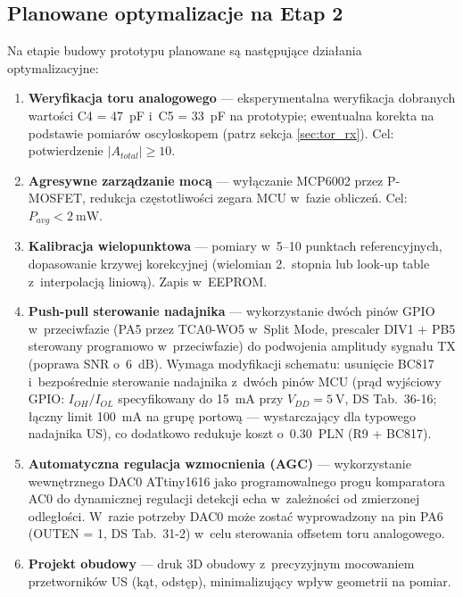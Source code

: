 \documentclass[a4paper,11pt]{article}
\begin{document}
\subsection{Planowane optymalizacje na Etap 2}

Na etapie budowy prototypu planowane są następujące działania optymalizacyjne:

\begin{enumerate}[nosep]
    \item \textbf{Weryfikacja toru analogowego} --- eksperymentalna weryfikacja
          dobranych wartości C4 = \SI{47}{\pico\farad} i~C5 = \SI{33}{\pico\farad}
          na prototypie; ewentualna korekta na podstawie pomiarów oscyloskopem
          (patrz sekcja \ref{sec:tor_rx}). Cel: potwierdzenie $|A_{total}| \geq 10$.
    \item \textbf{Agresywne zarządzanie mocą} --- wyłączanie MCP6002 przez
          P-MOSFET, redukcja częstotliwości zegara MCU w~fazie obliczeń.
          Cel: $P_{avg} < \SI{2}{\milli\watt}$.
    \item \textbf{Kalibracja wielopunktowa} --- pomiary w~5--10 punktach
          referencyjnych, dopasowanie krzywej korekcyjnej (wielomian 2.~stopnia
          lub look-up table z~interpolacją liniową). Zapis w~EEPROM.
    \item \textbf{Push-pull sterowanie nadajnika} --- wykorzystanie dwóch pinów
          GPIO w~przeciwfazie (PA5 przez TCA0-WO5 w~Split Mode, prescaler DIV1
          + PB5 sterowany
          programowo w~przeciwfazie) do podwojenia amplitudy sygnału TX
          (poprawa SNR o~\SI{6}{\deci\bel}). Wymaga modyfikacji schematu:
          usunięcie BC817 i~bezpośrednie sterowanie nadajnika z~dwóch pinów MCU
          (prąd wyjściowy GPIO: $I_{OH}/I_{OL}$ specyfikowany do \SI{15}{\milli\ampere}
          przy $V_{DD} = \SI{5}{\volt}$, DS Tab.~36-16; łączny limit \SI{100}{\milli\ampere}
          na grupę portową --- wystarczający dla typowego nadajnika US), co dodatkowo
          redukuje koszt o~\SI{0,30}{PLN} (R9 + BC817).
    \item \textbf{Automatyczna regulacja wzmocnienia (AGC)} --- wykorzystanie
          wewnętrznego DAC0 ATtiny1616 jako programowalnego progu komparatora AC0
          do dynamicznej regulacji detekcji echa w~zależności od zmierzonej
          odległości. W~razie potrzeby DAC0 może zostać wyprowadzony na pin PA6
          (OUTEN = 1, DS Tab.~31-2) w~celu sterowania offsetem toru analogowego.
    \item \textbf{Projekt obudowy} --- druk 3D obudowy z~precyzyjnym mocowaniem
          przetworników US (kąt, odstęp), minimalizujący wpływ geometrii na pomiar.
\end{enumerate}
\end{document}
